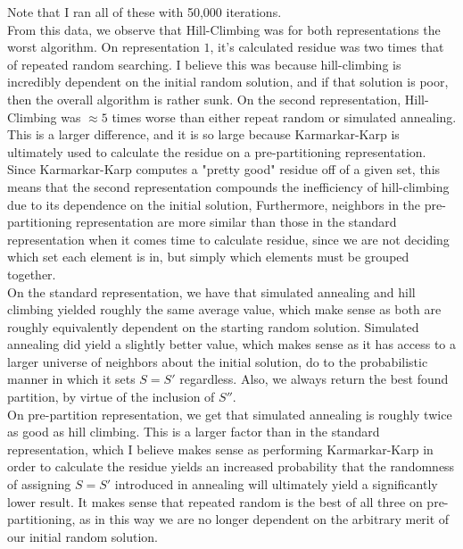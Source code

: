 \documentclass[10.5pt,letter]{article}
\begin{document}
Note that I ran all of these with 50,000 iterations. \\

From this data, we observe that Hill-Climbing was for both representations the worst algorithm. On representation $1$, it's calculated residue was two times that of repeated random searching. I believe this was because hill-climbing is incredibly dependent on the initial random solution, and if that solution is poor, then the overall algorithm is rather sunk. On the second representation, Hill-Climbing was $\approx 5$ times worse than either repeat random or simulated annealing. This is a larger difference, and it is so large because Karmarkar-Karp is ultimately used to calculate the residue on a pre-partitioning representation. Since Karmarkar-Karp computes a "pretty good" residue off of a given set, this means that the second representation compounds the inefficiency of hill-climbing due to its dependence on the initial solution, Furthermore, neighbors in the pre-partitioning representation are more similar than those in the standard representation when it comes time to calculate residue, since we are not deciding which set each element is in, but simply which elements must be grouped together. \\
On the standard representation, we have that simulated annealing and hill climbing yielded roughly the same average value, which make sense as both are roughly equivalently dependent on the starting random solution. Simulated annealing did yield a slightly better value, which makes sense as it has access to a larger universe of neighbors about the initial solution, do to the probabilistic manner in which it sets $S=S'$ regardless. Also, we always return the best found partition, by virtue of the inclusion of $S''$. \\
On pre-partition representation, we get that simulated annealing is roughly twice as good as hill climbing. This is a larger factor than in the standard representation, which I believe makes sense as performing Karmarkar-Karp in order to calculate the residue yields an increased probability that the randomness of assigning $S=S'$ introduced in annealing will ultimately yield a significantly lower result. It makes sense that repeated random is the best of all three on pre-partitioning, as in this way we are no longer dependent on the arbitrary merit of our initial random solution. \\
\end{document}
